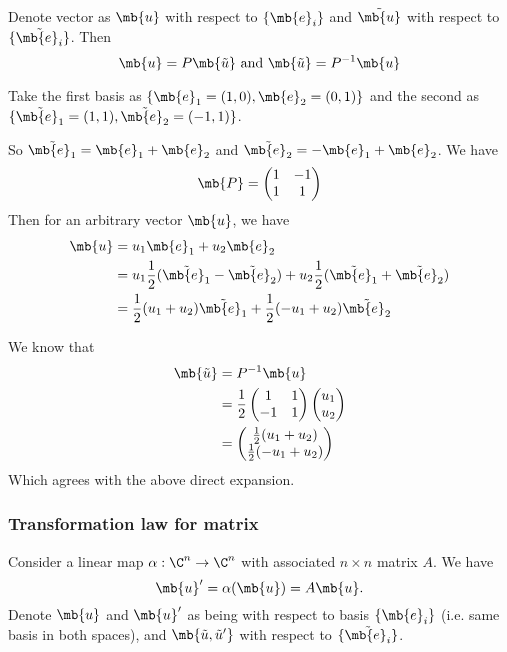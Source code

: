 \documentclass[a4paper]{article}
\begin{document}
\begin{thm}Denote vector as $\mb{u}$ with respect to $\{\mb{e}_i\}$ and $\tilde{\mb{u}}$ with respect to $\{\tilde{\mb{e}_i}\}$. Then 
  \[
  \mb{u} = P\mb{\tilde{u}}\text{ and }\mb{\tilde{u}} = P^{-1}\mb{u}
  \]
\end{thm}

\begin{eg}
  Take the first basis as $\{\mb{e}_1 = (1, 0), \mb{e}_2 = (0, 1)\}$ and the second as $\{\tilde{\mb{e}_1} = (1, 1), \tilde{\mb{e}_2} = (-1, 1)\}$.

So $\tilde{\mb{e}_1} = \mb{e}_1 + \mb{e}_2$ and $\tilde{\mb{e}_2} = -\mb{e}_1 + \mb{e}_2$. We have
\[
\mb{P} = 
\begin{pmatrix}
  1 & -1\\
  1 & 1
\end{pmatrix}
\]
Then for an arbitrary vector $\mb{u}$, we have
\begin{align*}
  \mb{u}&= u_1\mb{e}_1 + u_2\mb{e}_2\\
  &= u_1\frac{1}{2}(\tilde{\mb{e}_1} - \tilde{\mb{e}_2}) + u_2\frac{1}{2}(\tilde{\mb{e}_1} + \tilde{\mb{e}_2})\\
  &= \frac{1}{2}(u_1 + u_2)\tilde{\mb{e}_1} + \frac{1}{2}(-u_1 + u_2)\tilde{\mb{e}_2}
\end{align*}

We know that
\begin{align*}
  \mb{\tilde{u}} &= P^{-1} \mb{u}\\
  &= \frac{1}{2}
  \begin{pmatrix}
    1&1\\-1&1
  \end{pmatrix}
  \begin{pmatrix}
    u_1\\u_2
  \end{pmatrix}\\
  &= 
  \begin{pmatrix}
    \frac{1}{2}(u_1 + u_2)\\
    \frac{1}{2}(-u_1 + u_2)
  \end{pmatrix}
\end{align*}
Which agrees with the above direct expansion.
\end{eg}
\subsubsection{Transformation law for matrix}
Consider a linear map $\alpha: \C^n \to \C^n$ with associated $n\times n$ matrix $A$. We have
\[
\mb{u}' = \alpha(\mb{u}) = A\mb{u}.
\]
Denote $\mb{u}$ and $\mb{u}'$ as being with respect to basis $\{\mb{e}_i\}$ (i.e. same basis in both spaces), and $\mb{\tilde{u}, \tilde{u}'}$ with respect to $\{\tilde{\mb{e}_i}\}$.
\end{document}
